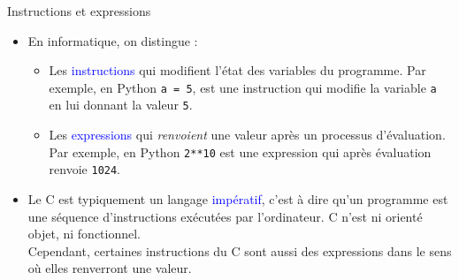 \documentclass[10pt]{beamer}
\begin{document}
\begin{frame}{\Ctitle}{\stitle}
	\begin{block}{Instructions et expressions}
		\begin{itemize}
			\item<1-> En informatique, on distingue :
			\begin{itemize}
			\item <1-> Les \textcolor{blue}{instructions} qui modifient l'état des variables du programme. Par exemple, en Python \texttt{a = 5}, est une instruction qui modifie la variable {\tt a} en lui donnant la valeur {\tt 5}.
			\item <1-> Les \textcolor{blue}{expressions} qui \textit{renvoient} une valeur après un processus d'évaluation. Par exemple, en Python \texttt{2**10} est une expression qui après évaluation renvoie {\tt 1024}.
			\end{itemize}
			\item <2-> Le C est typiquement un langage \textcolor{blue}{impératif}, c'est à dire qu'un programme est une séquence d'instructions exécutées par l'ordinateur. C n'est ni orienté objet, ni fonctionnel. \\
			\textcolor{BrickRed}{\small \danger \;} Cependant, certaines instructions du C sont aussi des expressions dans le sens où elles renverront une valeur.
		\end{itemize}
	\end{block}
\end{frame}
\end{document}
